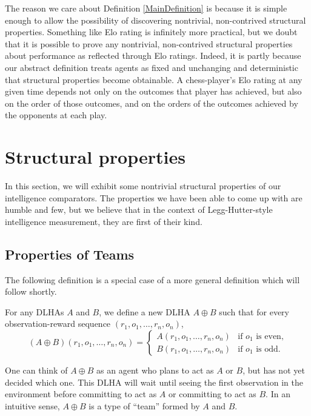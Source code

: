 \documentclass[twoside,11pt]{article}
\begin{document}
    The reason we care about Definition \ref{MainDefinition} is
    because it is simple enough to allow the possibility of
    discovering nontrivial, non-contrived structural properties.
    Something like Elo rating is infinitely more practical, but
    we doubt that it is possible to prove any nontrivial,
    non-contrived structural properties about performance as
    reflected through Elo ratings. Indeed, it is partly because
    our abstract definition treats agents as fixed and unchanging and deterministic
    that structural properties become obtainable. A chess-player's
    Elo rating at any given time depends not only on the outcomes
    that player has achieved, but also on the order of those outcomes,
    and on the orders of the outcomes achieved by the opponents
    at each play.



\section{Structural properties}

In this section, we will exhibit some nontrivial structural properties of
our intelligence comparators.
The properties we have been able to come up with are humble and few,
but we believe that in the context of Legg-Hutter-style intelligence measurement, they are
first of their kind.

\subsection{Properties of Teams}

The following definition is a special case of a more general definition which will
follow shortly.

\begin{definition}
\label{flexiblespecialcase}
For any DLHAs $A$ and $B$, we define a new
DLHA $A\oplus B$ such that for every observation-reward sequence
$(r_1,o_1,\ldots,r_n,o_n)$,
\[
(A\oplus B)(r_1,o_1,\ldots,r_n,o_n) =
    \begin{cases}
        A(r_1,o_1,\ldots,r_n,o_n) & \mbox{if $o_1$ is even,}\\
        B(r_1,o_1,\ldots,r_n,o_n) & \mbox{if $o_1$ is odd.}
    \end{cases}
\]
\end{definition}

One can think of $A\oplus B$ as an agent who plans to act as $A$ or $B$,
but has not yet decided which one. This DLHA will wait until seeing the first
observation in the environment before committing to act as $A$ or committing
to act as $B$. In an intuitive sense, $A\oplus B$ is a type of ``team'' formed
by $A$ and $B$.
\end{document}
